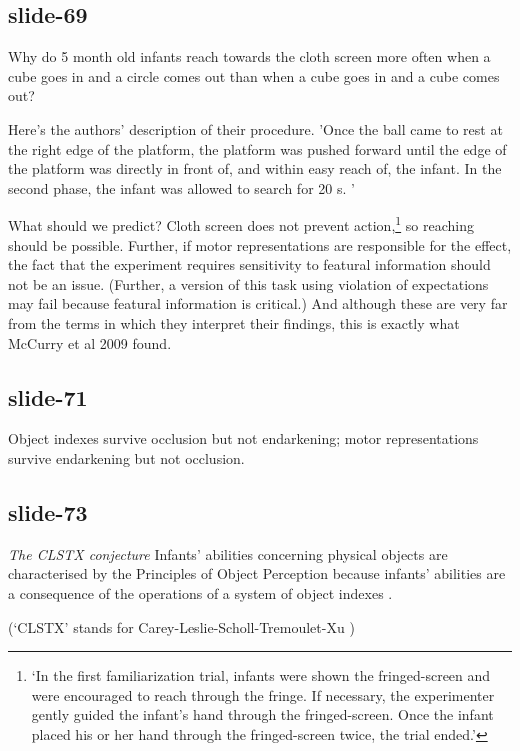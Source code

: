 \documentclass[12pt,\papersize]{extarticle}
\begin{document}
\subsection{slide-69}
Why do 5 month old infants reach towards the cloth screen more often when a cube
goes in and a circle comes out than when a cube goes in and a cube comes out?

Here's the authors' description of their procedure.
'Once the ball came to rest at the right edge of the platform, the platform was pushed forward
until the edge of the platform was directly in front of, and within easy reach of, the infant. In
the second phase, the infant was allowed to search for 20 s. ' \citep{mccurry:2009_beyond}

What should we predict?
Cloth screen does not prevent action,\footnote{
‘In the first familiarization trial, infants were shown the fringed-screen and were encouraged to
reach through the fringe. If necessary, the experimenter gently guided the infant’s hand through
the fringed-screen. Once the infant placed his or her hand through the fringed-screen twice, the
trial ended.’
}
so reaching should be possible.
Further, if motor representations are responsible for the effect, the fact that
the experiment requires sensitivity to featural information should not be an issue.
(Further, a version of this task using violation of expectations may fail
because featural information is critical.)
And although these are very far from the terms in which they interpret their findings,
this is exactly what McCurry et al 2009 found.

\subsection{slide-71}
Object indexes survive occlusion but not endarkening;
motor representations survive endarkening but not occlusion.
\subsection{slide-73}
\emph{The CLSTX conjecture}
Infants’ abilities concerning physical objects are
characterised by the Principles of Object Perception because infants’ abilities
are a consequence of the operations of a system of object indexes
\citep{Leslie:1998zk,Scholl:1999mi,Carey:2001ue,scholl:2007_objecta}.

(‘CLSTX’ stands for Carey-Leslie-Scholl-Tremoulet-Xu \citep[see][]{Leslie:1998zk,Scholl:1999mi,Carey:2001ue,scholl:2007_objecta})
\end{document}
